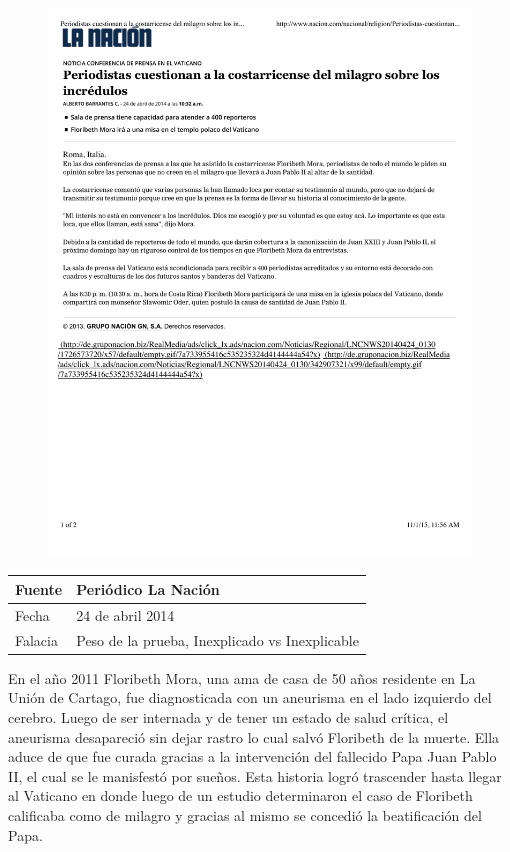 \documentclass[times]{simauth}
\begin{document}
\begin{figure}[h]
    \centering
    \includegraphics[width=15cm]{floribeth-mora-milagro}
    \label{fig:falacia2}
\end{figure}

\newpage

\begin{table}[h!]
    \begin{tabular}{ll} 
        \toprule[1.5pt]
        Fuente & Periódico La Nación\\
        \midrule[0.5pt]
        Fecha  & 24 de abril 2014\\
        \midrule[0.5pt]
        Falacia & Peso de la prueba, Inexplicado vs Inexplicable \\
        \bottomrule[1.5pt]
    \end{tabular} 
\end{table}

En el año 2011 Floribeth Mora, una ama de casa de 50 años residente en La Unión de Cartago, fue diagnosticada con un aneurisma en el lado izquierdo del cerebro. Luego de ser internada y de tener un estado de salud crítica, el aneurisma desapareció sin dejar rastro lo cual salvó Floribeth de la muerte. Ella aduce de que fue curada gracias a la intervención del fallecido Papa Juan Pablo II, el cual se le manisfestó por sueños. Esta historia logró trascender hasta llegar al Vaticano en donde luego de un estudio determinaron el caso de Floribeth calificaba como de milagro y gracias al mismo se concedió la beatificación del Papa.
\end{document}
